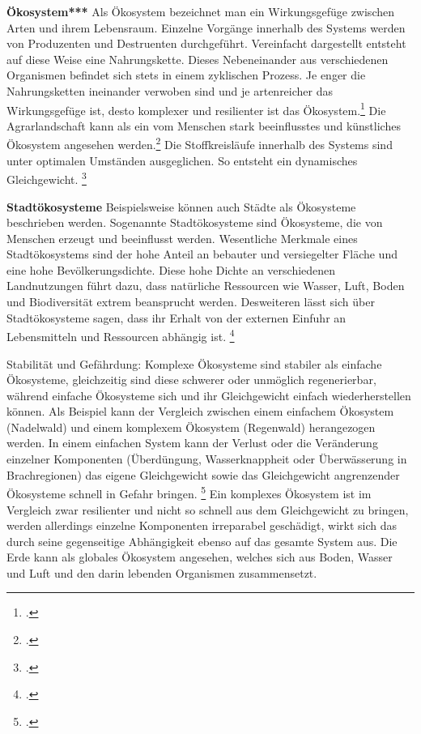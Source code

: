 \documentclass{scrartcl}
\begin{document}
\textbf{Ökosystem***} 
Als Ökosystem bezeichnet man ein Wirkungsgefüge zwischen Arten und ihrem Lebensraum. Einzelne Vorgänge innerhalb des Systems werden von Produzenten und Destruenten durchgeführt. Vereinfacht dargestellt entsteht auf diese Weise eine Nahrungskette. Dieses Nebeneinander aus verschiedenen Organismen befindet sich stets in einem zyklischen Prozess. Je enger die Nahrungsketten ineinander verwoben sind und je artenreicher das Wirkungsgefüge ist, desto komplexer und resilienter ist das Ökosystem.\footcite{NachhaltigeBrockhaus.de} Die Agrarlandschaft kann als ein vom Menschen stark beeinflusstes und künstliches Ökosystem angesehen werden.\footcite[Vgl.]{BrockhausOkosystem} Die Stoffkreisläufe innerhalb des Systems sind unter optimalen Umständen ausgeglichen. So entsteht ein dynamisches Gleichgewicht. \footcite{BrockhausOkosystem}

\textbf{Stadtökosysteme}
Beispielsweise können auch Städte als Ökosysteme beschrieben werden. Sogenannte Stadtökosysteme sind Ökosysteme, die von Menschen erzeugt und beeinflusst werden. Wesentliche Merkmale eines Stadtökosystems sind der hohe Anteil an bebauter und versiegelter Fläche und eine hohe Bevölkerungsdichte. Diese hohe Dichte an verschiedenen Landnutzungen führt dazu, dass natürliche Ressourcen wie Wasser, Luft, Boden und Biodiversität extrem beansprucht werden. Desweiteren lässt sich über Stadtökosysteme sagen, dass ihr Erhalt von der externen Einfuhr an Lebensmitteln und Ressourcen abhängig ist.  \footcite[S.61]{Breuste2016Stadtokosysteme}

\hfill \break
Stabilität und Gefährdung: Komplexe Ökosysteme sind stabiler als einfache Ökosysteme, gleichzeitig sind diese schwerer oder unmöglich regenerierbar, während einfache Ökosysteme sich und ihr Gleichgewicht einfach wiederherstellen können. Als Beispiel kann der Vergleich zwischen einem einfachem Ökosystem (Nadelwald) und einem komplexem Ökosystem (Regenwald) herangezogen werden.
In einem einfachen System kann der Verlust oder die Veränderung einzelner Komponenten (Überdüngung, Wasserknappheit oder Überwässerung in Brachregionen) das eigene Gleichgewicht sowie das Gleichgewicht angrenzender Ökosysteme schnell in Gefahr bringen. \footcite{DefinitionWirtschaftslexikone} Ein komplexes Ökosystem ist im Vergleich zwar resilienter und nicht so schnell aus dem Gleichgewicht zu bringen, werden allerdings einzelne Komponenten irreparabel geschädigt, wirkt sich das durch seine gegenseitige Abhängigkeit ebenso auf das gesamte System aus.
Die Erde kann als globales Ökosystem angesehen, welches sich aus Boden, Wasser und Luft und den darin lebenden Organismen zusammensetzt.
\end{document}
